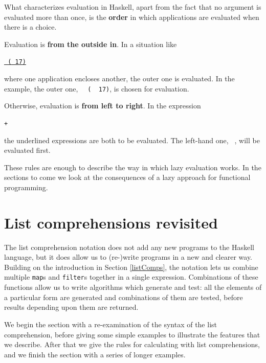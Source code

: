 What characterizes evaluation in Haskell, apart from the fact that no argument
is evaluated more than once, is the \textbf{order} in which applications are evaluated
when there is a choice.
\begin{titemize}
\item Evaluation is \textbf{from the outside in}. In a situation like
\begin{alltt}
\underline{ \eone\ \underline{( \etwo\ 17)}}
\end{alltt}
where one application encloses another, the outer one is evaluated. In the example, the outer one, \texttt{~\eone~( \etwo\ 17)}, is
chosen for evaluation. 
\item Otherwise, evaluation is \textbf{from left to right}.
In the expression
\begin{alltt}
\underline{ \eone} + \underline{ \etwo}
\end{alltt}
the underlined expressions are both to be evaluated. The left-hand one, 
\texttt{ \eone}, will be evaluated first.
\end{titemize}
These rules are enough to describe the way in which lazy evaluation works. In
the sections to come we look at the consequences of a lazy approach for
functional programming.


\section{List comprehensions revisited}
\label{listCompRev}

The list comprehension notation does not add any new programs to the
Haskell language, but it does allow us to (re-)write programs in a new and
clearer way. Building on the introduction in Section \ref{listComps}, the
notation lets us combine multiple \texttt{map}s and \texttt{filter}s together in a
single expression. Combinations of these functions
allow us to write algorithms which generate and test: all the elements
of a particular form are generated and  combinations of them are tested, before
results depending upon them are returned. 

We begin the section with a
re-examination of the syntax of the list comprehension, before giving some
simple examples to illustrate the features that we describe. After that we give the rules for calculating
with list comprehensions, and we finish the section with a series of longer
examples.

